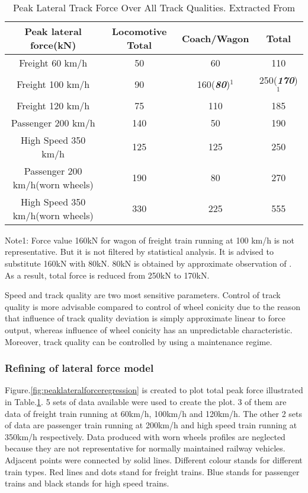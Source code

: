 \begin{table}[h!]
    \centering
    \caption{Peak Lateral Track Force Over All Track Qualities. Extracted From \cite[Tab. B1]{d181dt329}}
    \begin{tabular}{cccc}
        \hline
        Peak lateral force(kN) & Locomotive Total & Coach/Wagon & Total \\ 
        \hline
        Freight 60 km/h & 50 & 60 & 110\\
        Freight 100 km/h & 90 & 160(\textbf{\textit{80}})$^1$ & 250(\textbf{\textit{170}})$^1$\\
        Freight 120 km/h & 75 & 110 & 185 \\
        Passenger 200 km/h & 140 & 50 & 190 \\
        High Speed 350 km/h & 125 & 125 & 250 \\
        Passenger 200 km/h(worn wheels) & 190 & 80 & 270 \\
        High Speed 350 km/h(worn wheels) & 330 & 225 & 555 \\
        \hline
    \end{tabular}
    \begin{flushleft}
    Note1: Force value 160kN for wagon of freight train running at 100 km/h is not representative. But it is not filtered by statistical analysis. It is advised to substitute 160kN with 80kN. 80kN is obtained by approximate observation of \cite[Figure B7]{d181dt329}. As a result, total force is reduced from 250kN to 170kN.
    \end{flushleft}
    \label{tab:peaklateralforce}
\end{table}

Speed and track quality are two most sensitive parameters. Control of track quality is more advisable compared to control of wheel conicity due to the reason that influence of track quality deviation is simply approximate linear to force output, whereas influence of wheel conicity has an unpredictable characteristic. Moreover, track quality can be controlled by using a maintenance regime.

\subsubsection{Refining of lateral force model}

Figure.\ref{fig:peaklateralforceregression} is created to plot total peak force illustrated in Table.\ref{tab:peaklateralforce}. 5 sets of data available were used to create the plot. 3 of them are data of freight train running at 60km/h, 100km/h and 120km/h. The other 2 sets of data are passenger train running at 200km/h and high speed train running at 350km/h respectively. Data produced with worn wheels profiles are neglected because they are not representative for normally maintained railway vehicles. Adjacent points were connected by solid lines. Different colour stands for different train types. Red lines and dots stand for freight trains. Blue stands for passenger trains and black stands for high speed trains. 

